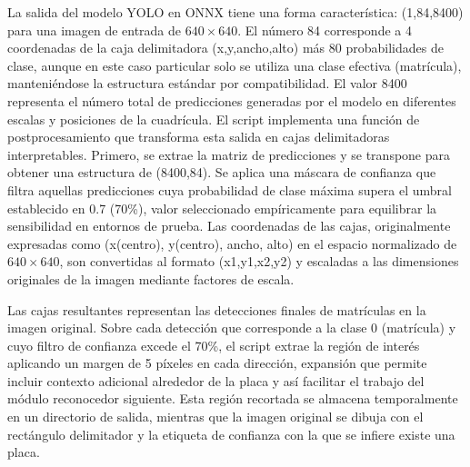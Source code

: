 La salida del modelo YOLO en ONNX tiene una forma característica: (1,84,8400) para una imagen de entrada de $640 \times 640$. El número 84 corresponde a 4 coordenadas de la caja delimitadora (x,y,ancho,alto) más 80 probabilidades de clase, aunque en este caso particular solo se utiliza una clase efectiva (matrícula), manteniéndose la estructura estándar por compatibilidad. El valor 8400 representa el número total de predicciones generadas por el modelo en diferentes escalas y posiciones de la cuadrícula. El script implementa una función de postprocesamiento que transforma esta salida en cajas delimitadoras interpretables. Primero, se extrae la matriz de predicciones y se transpone para obtener una estructura de (8400,84). Se aplica una máscara de confianza que filtra aquellas predicciones cuya probabilidad de clase máxima supera el umbral establecido en 0.7 (70\%), valor seleccionado empíricamente para equilibrar la sensibilidad en entornos de prueba. Las coordenadas de las cajas, originalmente expresadas como (x(centro), y(centro), ancho, alto) en el espacio normalizado de $640\times 640$, son convertidas al formato (x1,y1,x2,y2) y escaladas a las dimensiones originales de la imagen mediante factores de escala.

Las cajas resultantes representan las detecciones finales de matrículas en la imagen original. Sobre cada detección que corresponde a la clase 0 (matrícula) y cuyo filtro de confianza excede el 70\%, el script extrae la región de interés aplicando un margen de 5 píxeles en cada dirección, expansión que permite incluir contexto adicional alrededor de la placa y así facilitar el trabajo del módulo reconocedor siguiente. Esta región recortada se almacena temporalmente en un directorio de salida, mientras que la imagen original se dibuja con el rectángulo delimitador y la etiqueta de confianza con la que se infiere existe una placa.%


